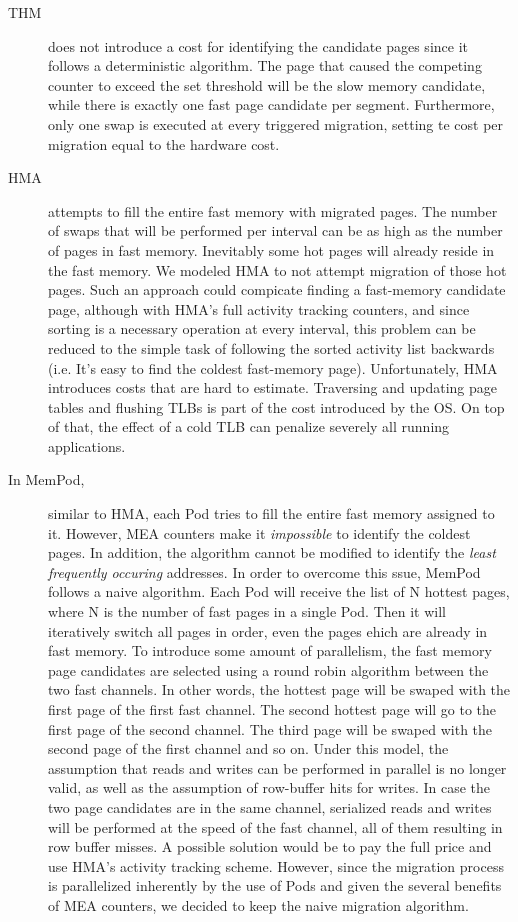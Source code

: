 \begin{description}
	\item[THM] does not introduce a cost for identifying the candidate pages since it follows a deterministic algorithm. The page that caused the competing counter to exceed the set threshold will be the slow memory candidate, while there is exactly one fast page candidate per segment. Furthermore, only one swap is executed at every triggered migration, setting te cost per migration equal to the hardware cost.
	\item[HMA ] attempts to fill the entire fast memory with migrated pages. The number of swaps that will be performed per interval can be as high as the number of pages in fast memory. Inevitably some hot pages will already reside in the fast memory. We modeled HMA to not attempt migration of those hot pages. Such an approach could compicate finding a fast-memory candidate page, although with HMA's full activity tracking counters, and since sorting is a necessary operation at every interval, this problem can be reduced to the simple task of following the sorted activity list backwards (i.e. It's easy to find the coldest fast-memory page). Unfortunately, HMA introduces costs that are hard to estimate. Traversing and updating page tables and flushing TLBs is part of the cost introduced by the OS. On top of that, the effect of a cold TLB can penalize severely all running applications.
	\item[In MemPod,] similar to HMA, each Pod tries to fill the entire fast memory assigned to it. However, MEA counters make it \textit{impossible} to identify the coldest pages. In addition, the algorithm cannot be modified to identify the \textit{least frequently occuring} addresses. In order to overcome this ssue, MemPod follows a naive algorithm. Each Pod will receive the list of N hottest pages, where N is the number of fast pages in a single Pod. Then it will iteratively switch all pages in order, even the pages ehich are already in fast memory. To introduce some amount of parallelism, the fast memory page candidates are selected using a round robin algorithm between the two fast channels. In other words, the hottest page will be swaped with the first page of the first fast channel. The second hottest page will go to the first page of the second channel. The third page will be swaped with the second page of the first channel and so on. Under this model, the assumption that reads and writes can be performed in parallel is no longer valid, as well as the assumption of row-buffer hits for writes. In case the two page candidates are in the same channel, serialized reads and writes will be performed at the speed of the fast channel, all of them resulting in row buffer misses. A possible solution would be to pay the full price and use HMA's activity tracking scheme. However, since the migration process is parallelized inherently by the use of Pods and given the several benefits of MEA counters, we decided to keep the naive migration algorithm.  


\end{description}

